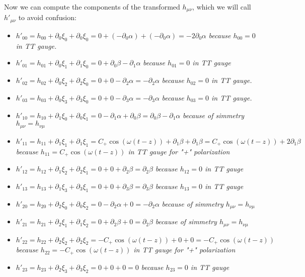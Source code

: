 Now we can compute the components of the transformed $h_{\mu \nu}$, which we will call $h'_{\mu\nu}$ to avoid confusion:

\begin{itemize}
    \item $h'_{00} = h_{00} + \partial_{0}\xi_{0}+\partial_{0}\xi_{0} = 0 + (-\partial_0 \alpha) + (-\partial_0 \alpha) = -2\partial_0 \alpha$ \emph{because $h_{00}=0$ in TT gauge.}
    \item $h'_{01} = h_{01} + \partial_0 \xi_1 + \partial_1 \xi_0 = 0 + \partial_0 \beta - \partial_1 \alpha$ \emph{because $h_{01}=0$ in TT gauge}
    \item $h'_{02} = h_{02} + \partial_0 \xi_2 + \partial_2 \xi_0 = 0 + 0 -\partial_2 \alpha = -\partial_2 \alpha$ \emph{because $h_{02}=0$ in TT gauge.}
    \item $h'_{03} = h_{03} + \partial_0 \xi_3 + \partial_3 \xi_0 = 0 + 0 -\partial_3 \alpha= -\partial_3 \alpha$ \emph{because $h_{03}=0$ in TT gauge.}
    \item $h'_{10} = h_{10} + \partial_1 \xi_0 + \partial_0 \xi_1 = 0 - \partial_1 \alpha + \partial_0 \beta = \partial_0 \beta - \partial_1 \alpha $ \emph{because of simmetry $h_{\mu\nu}=h_{\nu\mu}$}
    \item $h'_{11} = h_{11} + \partial_1 \xi_1 + \partial_1 \xi_1= C_{+} \cos(\omega(t-z)) + \partial_1 \beta + \partial_1 \beta = C_{+} \cos(\omega(t-z)) + 2\partial_1 \beta$ \emph{because $h_{11}=C_{+}\cos(\omega(t-z))$ in TT gauge for "+" polarization}
    \item $h'_{12} = h_{12} + \partial_1 \xi_2 + \partial_2 \xi_1 = 0 + 0 + \partial_2 \beta = \partial_2 \beta$ \emph{because $h_{12}=0$ in TT gauge}
    \item $h'_{13} = h_{13} + \partial_1 \xi_3 + \partial_3 \xi_1 = 0 + 0 + \partial_3 \beta = \partial_3 \beta$ \emph{because $h_{13}=0$ in TT gauge}
    \item $h'_{20} = h_{20} + \partial_2 \xi_0 + \partial_0 \xi_2 = 0 -\partial_2 \alpha + 0= -\partial_2 \alpha$ \emph{because of simmetry $h_{\mu\nu}=h_{\nu\mu}$}
    \item $h'_{21} = h_{21} + \partial_2 \xi_1 + \partial_1 \xi_2 = 0 + \partial_2 \beta + 0 = \partial_2 \beta$ \emph{because of simmetry $h_{\mu\nu}=h_{\nu\mu}$}
    \item $h'_{22} = h_{22} + \partial_2 \xi_2 + \partial_2 \xi_2= -C_{+} \cos(\omega(t-z)) + 0 + 0= -C_{+} \cos(\omega(t-z))$ \emph{because $h_{22}=-C_{+}\cos(\omega(t-z))$ in TT gauge for "+" polarization}
    \item $h'_{23} = h_{23} + \partial_2 \xi_3 + \partial_3 \xi_2 = 0 + 0 + 0 = 0$ \emph{because $h_{23}=0$ in TT gauge}

\end{itemize}
